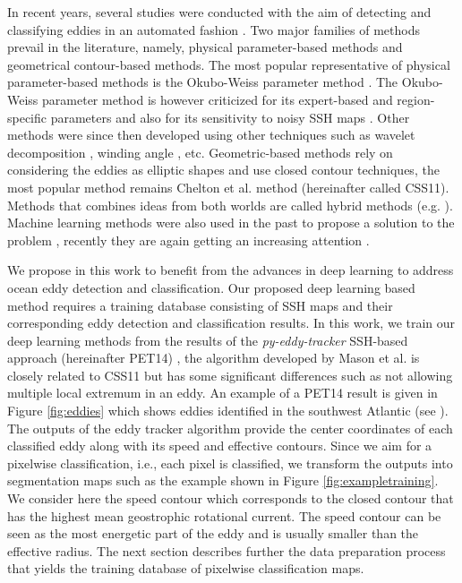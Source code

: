 \documentclass[journal]{IEEEtran}
\begin{document}
In recent years, several studies were conducted with the aim of detecting and classifying eddies in an automated fashion \cite{faghmous2012eddyscan}. Two major families of methods prevail in the literature, namely, physical parameter-based methods and geometrical contour-based methods. The most popular representative of physical parameter-based methods is the Okubo-Weiss parameter method \cite{okubo1970horizontal,weiss1991dynamics}. The Okubo-Weiss parameter method is however criticized for its expert-based and region-specific parameters and also for its sensitivity to noisy SSH maps \cite{chelton2007global}. Other methods were since then developed using other techniques such as wavelet decomposition \cite{turiel2007wavelet}, winding angle \cite{sadarjoen1999geometric}, etc. Geometric-based methods rely on considering the eddies as elliptic shapes and use closed contour techniques, the most popular method remains Chelton et al. method \cite{chelton2011global} (hereinafter called CSS11). Methods that combines ideas from both worlds are called hybrid methods (e.g. \cite{yi2014enhancing,isern2003identification}). Machine learning methods were also used in the past to propose a solution to the problem \cite{castellani2006identification,hai2008automatic}, recently they are again getting an increasing attention \cite{ashkezari2016oceanic,deepeddy}.  

We propose in this work to benefit from the advances in deep learning to address ocean eddy detection and classification. Our proposed deep learning based method requires a training database consisting of SSH maps and their corresponding eddy detection and classification results. In this work, we train our deep learning methods from the results of the \textit{py-eddy-tracker} SSH-based approach (hereinafter PET14) \cite{mason2014new}, the algorithm developed by Mason et al. is closely related to CSS11 but has some significant differences such as not allowing multiple local extremum in an eddy. An example of a PET14 result is given in Figure \ref{fig:eddies} which shows eddies identified in the southwest Atlantic (see \cite{mason17}). 
The outputs of the eddy tracker algorithm provide the center coordinates of each classified eddy along with its speed and effective contours. Since we aim for a pixelwise classification, i.e., each pixel is classified, we transform the outputs into segmentation maps such as the example shown in Figure \ref{fig:exampletraining}. We consider here the speed contour which corresponds to the closed contour that has the highest mean geostrophic rotational current. The speed contour can be seen as the most energetic part of the eddy and is usually smaller than the effective radius. The next section describes further the data preparation process that yields the training database of pixelwise classification maps.
\end{document}
